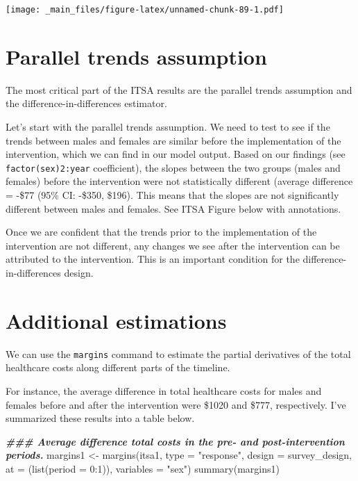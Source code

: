 \documentclass[
]{book}
\newenvironment{Shaded}{\begin{snugshade}}{\end{snugshade}}
\newcommand{\AttributeTok}[1]{\textcolor[rgb]{0.77,0.63,0.00}{#1}}
\newcommand{\DecValTok}[1]{\textcolor[rgb]{0.00,0.00,0.81}{#1}}
\newcommand{\DocumentationTok}[1]{\textcolor[rgb]{0.56,0.35,0.01}{\textbf{\textit{#1}}}}
\newcommand{\FunctionTok}[1]{\textcolor[rgb]{0.00,0.00,0.00}{#1}}
\newcommand{\NormalTok}[1]{#1}
\newcommand{\OtherTok}[1]{\textcolor[rgb]{0.56,0.35,0.01}{#1}}
\newcommand{\SpecialCharTok}[1]{\textcolor[rgb]{0.00,0.00,0.00}{#1}}
\newcommand{\StringTok}[1]{\textcolor[rgb]{0.31,0.60,0.02}{#1}}
\begin{document}
\texttt{[image: \_main\_files/figure-latex/unnamed-chunk-89-1.pdf]}

\hypertarget{parallel-trends-assumption}{%
\section{Parallel trends assumption}\label{parallel-trends-assumption}}

The most critical part of the ITSA results are the parallel trends assumption and the difference-in-differences estimator.

Let's start with the parallel trends assumption. We need to test to see if the trends between males and females are similar before the implementation of the intervention, which we can find in our model output. Based on our findings (see \texttt{factor(sex)2:year} coefficient), the slopes between the two groups (males and females) before the intervention were not statistically different (average difference = -\$77 (95\% CI: -\$350, \$196). This means that the slopes are not significantly different between males and females. See ITSA Figure below with annotations.

Once we are confident that the trends prior to the implementation of the intervention are not different, any changes we see after the intervention can be attributed to the intervention. This is an important condition for the difference-in-differences design.

\hypertarget{additional-estimations}{%
\section{Additional estimations}\label{additional-estimations}}

We can use the \texttt{margins} command to estimate the partial derivatives of the total healthcare costs along different parts of the timeline.

For instance, the average difference in total healthcare costs for males and females before and after the intervention were \$1020 and \$777, respectively. I've summarized these results into a table below.

\begin{Shaded}
\begin{Highlighting}[]
\DocumentationTok{\#\#\# Average difference total costs in the pre{-} and post{-}intervention periods. }
\NormalTok{margins1 }\OtherTok{\textless{}{-}} \FunctionTok{margins}\NormalTok{(itsa1, }\AttributeTok{type =} \StringTok{"response"}\NormalTok{, }\AttributeTok{design =}\NormalTok{ survey\_design, }\AttributeTok{at =}\NormalTok{ (}\FunctionTok{list}\NormalTok{(}\AttributeTok{period =} \DecValTok{0}\SpecialCharTok{:}\DecValTok{1}\NormalTok{)), }\AttributeTok{variables =} \StringTok{"sex"}\NormalTok{)}
\FunctionTok{summary}\NormalTok{(margins1)}
\end{Highlighting}
\end{Shaded}
\end{document}
